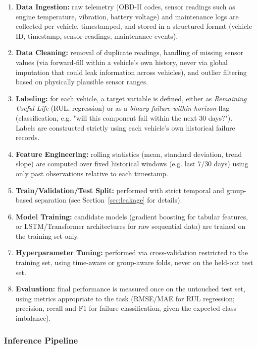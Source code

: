 \documentclass[11pt,a4paper]{article}
\begin{document}
\begin{enumerate}
    \item \textbf{Data Ingestion:} raw telemetry (OBD-II codes, sensor readings such as engine temperature, vibration, battery voltage) and maintenance logs are collected per vehicle, timestamped, and stored in a structured format (vehicle ID, timestamp, sensor readings, maintenance events).
    \item \textbf{Data Cleaning:} removal of duplicate readings, handling of missing sensor values (via forward-fill within a vehicle's own history, never via global imputation that could leak information across vehicles), and outlier filtering based on physically plausible sensor ranges.
    \item \textbf{Labeling:} for each vehicle, a target variable is defined, either as \textit{Remaining Useful Life} (RUL, regression) or as a \textit{binary failure-within-horizon} flag (classification, e.g. "will this component fail within the next 30 days?"). Labels are constructed strictly using each vehicle's own historical failure records.
    \item \textbf{Feature Engineering:} rolling statistics (mean, standard deviation, trend slope) are computed over fixed historical windows (e.g. last 7/30 days) using only past observations relative to each timestamp.
    \item \textbf{Train/Validation/Test Split:} performed with strict temporal and group-based separation (see Section~\ref{sec:leakage} for details).
    \item \textbf{Model Training:} candidate models (gradient boosting for tabular features, or LSTM/Transformer architectures for raw sequential data) are trained on the training set only.
    \item \textbf{Hyperparameter Tuning:} performed via cross-validation restricted to the training set, using time-aware or group-aware folds, never on the held-out test set.
    \item \textbf{Evaluation:} final performance is measured once on the untouched test set, using metrics appropriate to the task (RMSE/MAE for RUL regression; precision, recall and F1 for failure classification, given the expected class imbalance).
\end{enumerate}

\subsubsection{Inference Pipeline}
\end{document}
